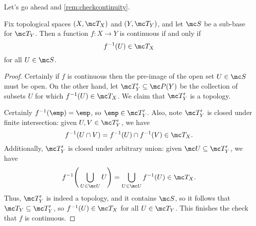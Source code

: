 \documentclass[../notes.tex]{subfiles}
\begin{document}
Let's go ahead and \autoref{rem:checkcontinuity}.
\begin{proposition}
	Fix topological spaces $(X,\mc T_X)$ and $(Y,\mc T_Y)$, and let $\mc S$ be a sub-base for $\mc T_Y$. Then a function $f\colon X\to Y$ is continuous if and only if
	\[f^{-1}(U)\in\mc T_X\]
	for all $U\in\mc S$.
\end{proposition}
\begin{proof}
	Certainly if $f$ is continuous then the pre-image of the open set $U\in\mc S$ must be open. On the other hand, let $\mc T_Y'\subseteq\mc P(Y)$ be the collection of subsets $U$ for which $f^{-1}(U)\in\mc T_X$. We claim that $\mc T_Y'$ is a topology.
	
	Certainly $f^{-1}(\emp)=\emp$, so $\emp\in\mc T'_Y$. Also, note $\mc T_Y'$ is closed under finite intersection: given $U,V\in\mc T_Y'$, we have
	\[f^{-1}(U\cap V)=f^{-1}(U)\cap f^{-1}(V)\in\mc T_X.\]
	Additionally, $\mc T_Y'$ is closed under arbitrary union: given $\mc U\subseteq\mc T'_Y$, we have
	\[f^{-1}\Bigg(\bigcup_{U\in\mc U}U\Bigg)=\bigcup_{U\in\mc U}f^{-1}(U)\in\mc T_X.\]
	Thus, $\mc T'_Y$ is indeed a topology, and it contains $\mc S$, so it follows that $\mc T_Y\subseteq\mc T'_Y$, so $f^{-1}(U)\in\mc T_X$ for all $U\in\mc T_Y$. This finishes the check that $f$ is continuous.
\end{proof}
\end{document}
